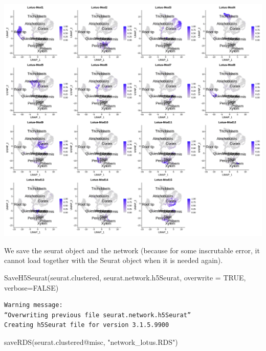 \documentclass[
  letterpaper,
  DIV=11,
  numbers=noendperiod]{scrartcl}
\newenvironment{Shaded}{\begin{snugshade}}{\end{snugshade}}
\newcommand{\AttributeTok}[1]{\textcolor[rgb]{0.40,0.45,0.13}{#1}}
\newcommand{\ConstantTok}[1]{\textcolor[rgb]{0.56,0.35,0.01}{#1}}
\newcommand{\FunctionTok}[1]{\textcolor[rgb]{0.28,0.35,0.67}{#1}}
\newcommand{\NormalTok}[1]{\textcolor[rgb]{0.00,0.23,0.31}{#1}}
\newcommand{\SpecialCharTok}[1]{\textcolor[rgb]{0.37,0.37,0.37}{#1}}
\newcommand{\StringTok}[1]{\textcolor[rgb]{0.13,0.47,0.30}{#1}}
\begin{document}
\includegraphics{tutorial-2024_files/figure-pdf/cell-135-output-3.png}

We save the seurat object and the network (because for some inscrutable
error, it cannot load together with the Seurat object when it is needed
again).

\begin{Shaded}
\begin{Highlighting}[]
\FunctionTok{SaveH5Seurat}\NormalTok{(seurat.clustered, }\StringTok{\textquotesingle{}seurat.network.h5Seurat\textquotesingle{}}\NormalTok{, }\AttributeTok{overwrite =} \ConstantTok{TRUE}\NormalTok{, }\AttributeTok{verbose=}\ConstantTok{FALSE}\NormalTok{)}
\end{Highlighting}
\end{Shaded}

\begin{verbatim}
Warning message:
“Overwriting previous file seurat.network.h5Seurat”
Creating h5Seurat file for version 3.1.5.9900
\end{verbatim}

\begin{Shaded}
\begin{Highlighting}[]
\FunctionTok{saveRDS}\NormalTok{(seurat.clustered}\SpecialCharTok{@}\NormalTok{misc, }\StringTok{"network\_lotus.RDS"}\NormalTok{)}
\end{Highlighting}
\end{Shaded}
\end{document}
